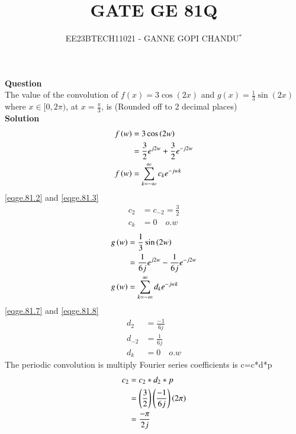 \documentclass[journal,12pt,twocolumn]{IEEEtran}
\theoremstyle{remark}
\begin{document}

\vspace{3cm}
\title{GATE GE 81Q}
\author{EE23BTECH11021 - GANNE GOPI CHANDU$^{*}$%
}
\maketitle
\bigskip
\renewcommand{\thefigure}{\theenumi}
\renewcommand{\thetable}{\theenumi}

\textbf{Question}\\
The value of the convolution of $f(x) = 3\cos(2x)$ and $g(x) = \frac{1}{3}\sin(2x)$ where $x \in [0, 2\pi)$, at $x = \frac{\pi}{3}$, is (Rounded off to 2 decimal places)\\
\textbf{Solution}\\
\begin{align}
    f\left(w\right)&=3\cos\left(2w\right)\\
    &=\frac{3}{2}e^{j2w}+\frac{3}{2}e^{-j2w} \label{eqge.81.2}\\
    f\left(w\right)&=\sum_{k=-\infty}^{\infty}c_k e^{-j w k} \label{eqge.81.3}
\end{align}
    \eqref{eqge.81.2} and \eqref{eqge.81.3} \\
\begin{align}
   c_2&=c_{-2}=\frac{3}{2}\\
   c_{k}&=0 \quad{o.w}
\end{align}
\begin{align}
    g\left(w\right)&=\frac{1}{3}\sin\left(2w\right)\\
    &=\frac{1}{6j}e^{j2w}-\frac{1}{6j}e^{-j2w} \label{eqge.81.7} \\
    g\left(w\right)&=\sum_{k=-\infty}^{\infty}d_{k} e^{-j w k} \label{eqge.81.8}
\end{align}
    \eqref{eqge.81.7} and \eqref{eqge.81.8} \\
\begin{align}
   d_{2}&=\frac{-1}{6j}\\
   d_{-2}&=\frac{1}{6j}\\
   d_{k}&=0 \quad{o.w}
\end{align}
The periodic convolution is multiply Fourier series coefficients is
c=c*d*p\\
\begin{align}
    c_{2}&=c_{2}*d_{2}*p\\
    &=\left(\frac{3}{2}\right)\left(\frac{-1}{6j}\right)\left(2\pi\right)\\
    &=\frac{-\pi}{2j}
\end{align}
\end{document}
